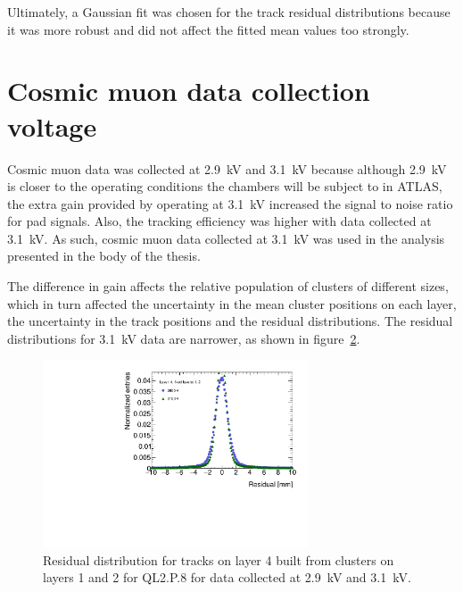 \begin{figure}
  \caption{}
  \label{fig:double_Gaussian_compare_fits}

\end{figure}
\newpage
\restoregeometry

Ultimately, a Gaussian fit was chosen for the track residual distributions because it was more robust and did not affect the fitted mean values too strongly.

\section{Cosmic muon data collection voltage}
\label{appendix:systematics_2900V_vs_3100V}


Cosmic muon data was collected at 2.9~kV and 3.1~kV because although 2.9~kV is closer to the operating conditions the chambers will be subject to in ATLAS, the extra gain provided by operating at 3.1~kV increased the signal to noise ratio for pad signals. Also, the tracking efficiency was higher with data collected at 3.1~kV. As such, cosmic muon data collected at 3.1~kV was used in the analysis presented in the body of the thesis.

The difference in gain affects the relative population of clusters of different sizes, which in turn affected the uncertainty in the mean cluster positions on each layer, the uncertainty in the track positions and the residual distributions. The residual distributions for 3.1~kV data are narrower, as shown in figure~\ref{fig:res_dist_2900V_3100V_412}.

\begin{figure}
    \centering
    \includegraphics[width = 0.7\textwidth]{figures/figure_residual_distributions_blue_QL2P08_2900V_2021-05-21_green_QL2P08_3100V_2021-05-21_layer4_fixedlayers12.pdf}
    \caption{Residual distribution for tracks on layer 4 built from clusters on layers 1 and 2 for QL2.P.8 for data collected at 2.9~kV and 3.1~kV.}
    \label{fig:res_dist_2900V_3100V_412}
\end{figure}

